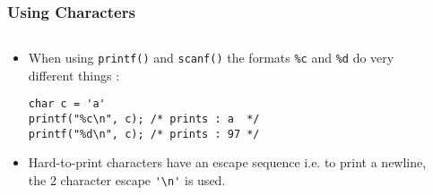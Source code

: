 \begin{frame}[fragile]
\frametitle{Using Characters}
\begin{columns}

\begin{column}{0.45\textwidth}
\begin{itemize}
\item When using \verb^printf()^ and \verb^scanf()^ the formats
\verb^%c^ and \verb^%d^ do very different things :
\begin{verbatim}
char c = 'a'
printf("%c\n", c); /* prints : a  */
printf("%d\n", c); /* prints : 97 */
\end{verbatim}
\item Hard-to-print characters have an escape sequence
i.e. to print a newline, the 2 character escape \verb^'\n'^ is used.
\end{itemize}
\end{column}

\begin{column}{0.45\textwidth}
\begin{itemize}
\end{itemize}
\end{column}
\end{columns}
\end{frame}

\endinput



\newpage
\section*{Using {\tt getchar()} and {\tt putchar()}}

\begin{verbatim}
/* Outputs characters twice */                                                     
#include <stdio.h>

int main(void)
{

   char c;
   while (1) {
      c = getchar();
      putchar(c);
      putchar(c);
   }
   return 0;
}
\end{verbatim}
\newpage

This has the unfortunate problem of never terminating,
a {\tt CTRL-C} would be required.

\begin{verbatim}
#include <stdio.h>

int main(void)
{
   int   c;

   while ((c = getchar()) != EOF) {
      putchar(c);
      putchar(c);
   }
   return 0;
}
\end{verbatim}

